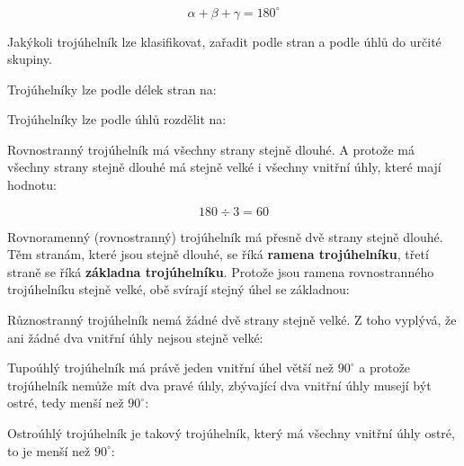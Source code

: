 $$ \alpha + \beta + \gamma = 180^\circ $$


Jakýkoli trojúhelník lze klasifikovat, zařadit podle stran a podle úhlů do určité skupiny. 

Trojúhelníky lze podle délek stran na:

\vskip 4mm
\vskip 4mm

Trojúhelníky lze podle úhlů rozdělit na:

\vskip 4mm
\vskip 4mm


Rovnostranný trojúhelník má všechny strany stejně dlouhé. A protože má všechny strany stejně dlouhé má stejně velké i všechny vnitřní úhly, které mají hodnotu:

$$ 180 \div 3 = 60 $$

\vskip 4mm
\centerline{}
\vskip 4mm


Rovnoramenný (rovnostranný) trojúhelník má přesně dvě strany stejně dlouhé. Těm stranám, které jsou stejně dlouhé, se říká {\bf ramena trojúhelníku}, třetí straně se říká {\bf základna trojúhelníku}. Protože jsou ramena rovnostranného trojúhelníku stejně velké, obě svírají stejný úhel se základnou:

\vskip 4mm
\centerline{}
\vskip 4mm


Různostranný trojúhelník nemá žádné dvě strany stejně velké. Z toho vyplývá, že ani žádné dva vnitřní úhly nejsou stejně velké:

\vskip 4mm
\centerline{}
\vskip 4mm


Tupoúhlý trojúhelník má právě jeden vnitřní úhel větší než $90^\circ$ a protože trojúhelník nemůže mít dva pravé úhly, zbývající dva vnitřní úhly musejí být ostré, tedy menší než $90^\circ$:

\vskip 4mm
\centerline{}
\vskip 4mm


Ostroúhlý trojúhelník je takový trojúhelník, který má všechny vnitřní úhly ostré, to je menší než $90^\circ$:

